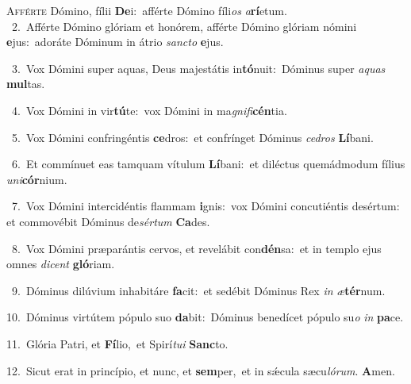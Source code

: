 \lettrine{\initial\textcolor{\initialcolor}{A}}{fférte} Dómino, fílii \textbf{De}\-i:~\star afférte Dómino fíli\textit{os} \textit{a}\-\textbf{rí}etum.\\
{\numbfont\textcolor{\numbcolor}{~2.}}~Afférte Dómino glóriam et honórem, afférte Dómino glóriam nómini \textbf{e}\-jus:~\star adoráte Dóminum in átrio \textit{sanc}\-\textit{to} \textbf{e}\-jus.\par
{\numbfont\textcolor{\numbcolor}{~3.}}~Vox Dómini super aquas, Deus majestátis in\-\textbf{tó}\-nuit:~\star Dóminus super \textit{a}\-\textit{quas} \textbf{mul}\-tas.\par
{\numbfont\textcolor{\numbcolor}{~4.}}~Vox Dómini in vir\-\textbf{tú}\-te:~\star vox Dómini in ma\-\textit{gni}\-\textit{fi}\textbf{cén}tia.\par
{\numbfont\textcolor{\numbcolor}{~5.}}~Vox Dómini confringéntis \textbf{ce}\-dros:~\star et confrínget Dóminus \textit{ce}\-\textit{dros} \textbf{Lí}\-bani.\par
{\numbfont\textcolor{\numbcolor}{~6.}}~Et commínuet eas tamquam vítulum \textbf{Lí}\-bani:~\star et diléctus quemádmodum fílius \textit{u}\-\textit{ni}\textbf{cór}nium.\par
{\numbfont\textcolor{\numbcolor}{~7.}}~Vox Dómini intercidéntis flammam \textbf{i}\-gnis:~\star vox Dómini concutiéntis desértum: et commovébit Dóminus de\-\textit{sér}\-\textit{tum} \textbf{Ca}\-des.\par
{\numbfont\textcolor{\numbcolor}{~8.}}~Vox Dómini præparántis cervos, et revelábit con\-\textbf{dén}\-sa:~\star et in templo ejus omnes \textit{di}\-\textit{cent} \textbf{gló}\-riam.\par
{\numbfont\textcolor{\numbcolor}{~9.}}~Dóminus dilúvium inhabitáre \textbf{fa}\-cit:~\star et sedébit Dóminus Rex \textit{in} \textit{æ}\-\textbf{tér}num.\par
{\numbfont\textcolor{\numbcolor}{10.}}~Dóminus virtútem pópulo suo \textbf{da}\-bit:~\star Dóminus benedícet pópulo su\textit{o} \textit{in} \textbf{pa}\-ce.\par
{\numbfont\textcolor{\numbcolor}{11.}}~Glória Patri, et \textbf{Fí}\-lio,~\star et Spirí\-\textit{tu}\-\textit{i} \textbf{Sanc}\-to.\par
{\numbfont\textcolor{\numbcolor}{12.}}~Sicut erat in princípio, et nunc, et \textbf{sem}\-per,~\star et in sǽcula sæcu\-\textit{ló}\-\textit{rum}. \textbf{A}\-men.\par
